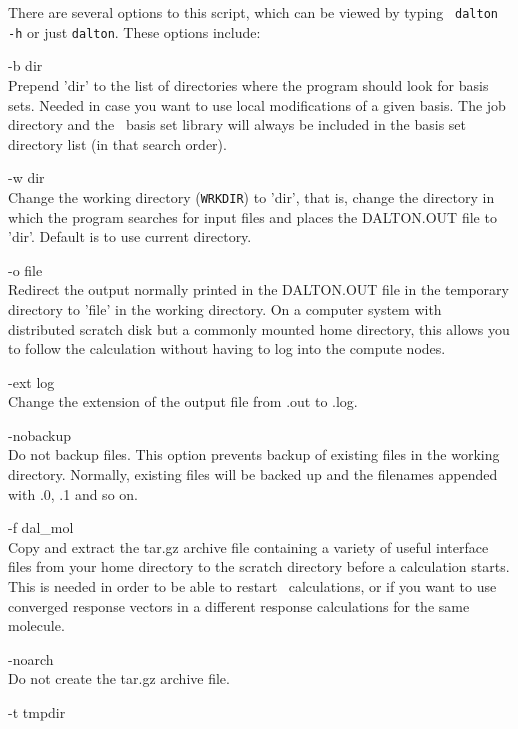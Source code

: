 There are several options to this script,
which can be viewed by typing \verb| dalton -h| or just \verb|dalton|.
These options include:

\begin{list}{--}{}
\item[-b dir \hfill] \hfill \\
  Prepend 'dir' to the list of directories where the program
  should look for basis sets. Needed in case you want to use
  local modifications of a given basis. The job directory and the \dalton\ basis set library will always be included in the basis set directory list
  (in that search order).
\item[-w dir \hfill] \hfill \\
  Change the working directory (\verb|WRKDIR|) to 'dir', that is,
  change the directory in which the program searches for input files
  and places the DALTON.OUT file to 'dir'. Default is to use current
  directory.
\item[-o file \hfill] \hfill \\
  Redirect the output normally printed in the
  DALTON.OUT file in the temporary directory
  to 'file' in the working
  directory. On a computer system with distributed scratch disk but a
  commonly mounted home directory, this allows you to follow the
  calculation without having to log into the compute nodes.
\item[-ext log \hfill] \hfill \\
  Change the extension of the output file from .out to .log.
\item[-nobackup \hfill] \hfill \\
  Do not backup files. This option prevents backup of existing files in the working
  directory. Normally, existing files will be backed up and the filenames appended with
  .0, .1 and so on.
\item[-f dal\_mol \hfill] \hfill \\
  Copy and extract the tar.gz archive file containing a variety of useful
  interface files from your home directory to the scratch directory
  before a calculation starts. This is needed in order to be able to
  restart \dalton\ calculations, or if you want to use converged response
  vectors in a different response calculations for the same molecule.
\item[-noarch \hfill] \hfill \\
  Do not create the tar.gz archive file.
\item[-t tmpdir \hfill] \hfill \\

\end{list}
